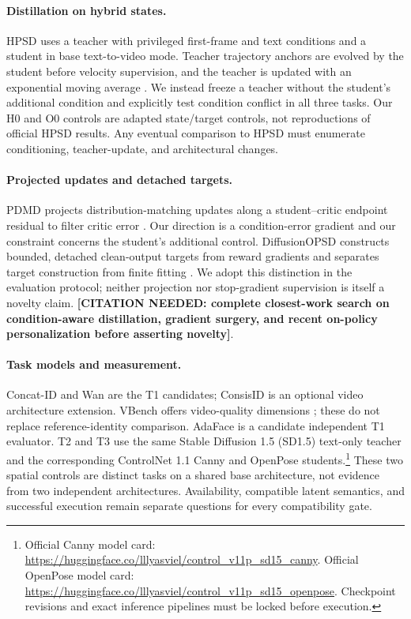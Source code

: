 \documentclass{article}
\newcommand{\cneed}[1]{\textbf{[CITATION NEEDED: #1]}}
\begin{document}
\paragraph{Distillation on hybrid states.}
HPSD uses a teacher with privileged first-frame and text conditions and a student in base text-to-video mode. Teacher trajectory anchors are evolved by the student before velocity supervision, and the teacher is updated with an exponential moving average \cite{hpsd}. We instead freeze a teacher without the student's additional condition and explicitly test condition conflict in all three tasks. Our H0 and O0 controls are adapted state/target controls, not reproductions of official HPSD results. Any eventual comparison to HPSD must enumerate conditioning, teacher-update, and architectural changes.

\paragraph{Projected updates and detached targets.}
PDMD projects distribution-matching updates along a student--critic endpoint residual to filter critic error \cite{pdmd}. Our direction is a condition-error gradient and our constraint concerns the student's additional control. DiffusionOPSD constructs bounded, detached clean-output targets from reward gradients and separates target construction from finite fitting \cite{diffusionopsd}. We adopt this distinction in the evaluation protocol; neither projection nor stop-gradient supervision is itself a novelty claim. \cneed{complete closest-work search on condition-aware distillation, gradient surgery, and recent on-policy personalization before asserting novelty}.

\paragraph{Task models and measurement.}
Concat-ID \cite{concatid} and Wan \cite{wan} are the T1 candidates; ConsisID \cite{consisid} is an optional video architecture extension. VBench offers video-quality dimensions \cite{vbench}; these do not replace reference-identity comparison. AdaFace \cite{adaface} is a candidate independent T1 evaluator. T2 and T3 use the same Stable Diffusion 1.5 (SD1.5) text-only teacher and the corresponding ControlNet 1.1 Canny and OpenPose students.\footnote{Official Canny model card: \url{https://huggingface.co/lllyasviel/control_v11p_sd15_canny}. Official OpenPose model card: \url{https://huggingface.co/lllyasviel/control_v11p_sd15_openpose}. Checkpoint revisions and exact inference pipelines must be locked before execution.} These two spatial controls are distinct tasks on a shared base architecture, not evidence from two independent architectures. Availability, compatible latent semantics, and successful execution remain separate questions for every compatibility gate.
\end{document}
